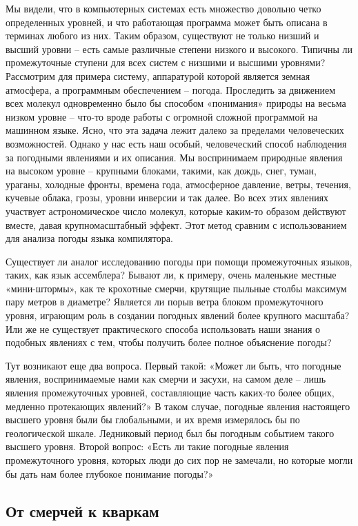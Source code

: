 \documentclass[../main.tex]{subfiles}
\begin{document}
Мы видели, что в компьютерных системах есть множество довольно четко определенных уровней, и что работающая программа может быть описана в терминах любого из них. Таким образом, существуют не только низший и высший уровни \--- есть самые различные степени низкого и высокого. Типичны ли промежуточные ступени для всех систем с низшими и высшими уровнями? Рассмотрим для примера систему, аппаратурой которой является земная атмосфера, а программным обеспечением \--- погода. Проследить за движением всех молекул одновременно было бы способом «понимания» природы на весьма низком уровне \--- что-то вроде работы с огромной сложной программой на машинном языке. Ясно, что эта задача лежит далеко за пределами человеческих возможностей. Однако у нас есть наш особый, человеческий способ наблюдения за погодными явлениями и их описания. Мы воспринимаем природные явления на высоком уровне \--- крупными блоками, такими, как дождь, снег, туман, ураганы, холодные фронты, времена года, атмосферное давление, ветры, течения, кучевые облака, грозы, уровни инверсии и так далее. Во всех этих явлениях участвует астрономическое число молекул, которые каким-то образом действуют вместе, давая крупномасштабный эффект. Этот метод сравним с использованием для анализа погоды языка компилятора.

Существует ли аналог исследованию погоды при помощи промежуточных языков, таких, как язык ассемблера? Бывают ли, к примеру, очень маленькие местные «мини-штормы», как те крохотные смерчи, крутящие пыльные столбы максимум пару метров в диаметре? Является ли порыв ветра блоком промежуточного уровня, играющим роль в создании погодных явлений более крупного масштаба? Или же не существует практического способа использовать наши знания о подобных явлениях с тем, чтобы получить более полное объяснение погоды?

Тут возникают еще два вопроса. Первый такой: «Может ли быть, что погодные явления, воспринимаемые нами как смерчи и засухи, на самом деле \--- лишь явления промежуточных уровней, составляющие часть каких-то более общих, медленно протекающих явлений?» В таком случае, погодные явления настоящего высшего уровня были бы глобальными, и их время измерялось бы по геологической шкале. Ледниковый период был бы погодным событием такого высшего уровня. Второй вопрос: «Есть ли такие погодные явления промежуточного уровня, которых люди до сих пор не замечали, но которые могли бы дать нам более глубокое понимание погоды?»


\subsection{От смерчей к кваркам}
\end{document}
